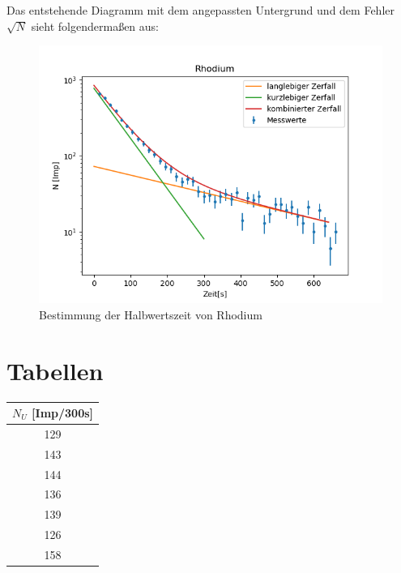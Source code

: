 \documentclass[titlepage=firstcover, captions=tableheading]{scrartcl}
\begin{document}
Das entstehende Diagramm mit dem angepassten Untergrund und dem Fehler $\sqrt{N}$ sieht folgendermaßen aus:

\begin{figure}[H]
    \centering
    \includegraphics{"3.png"}
    \caption{Bestimmung der Halbwertszeit von Rhodium}
    \label{Fig:HalbwertszeitRh}
\end{figure}




\section{Tabellen}
\begin{minipage}{\linewidth}
    \begin{table}[H]
        \centering
    
    \begin{tabular}{c}
        \toprule
        $N_U$ [Imp/300s]\\
        \midrule
        129 \\
        143 \\
        144 \\
        136 \\
        139 \\
        126 \\
        158 \\
        \bottomrule
        
    \end{tabular}
    \label{tab:1}
\end{table}
\end{minipage}
\end{document}
